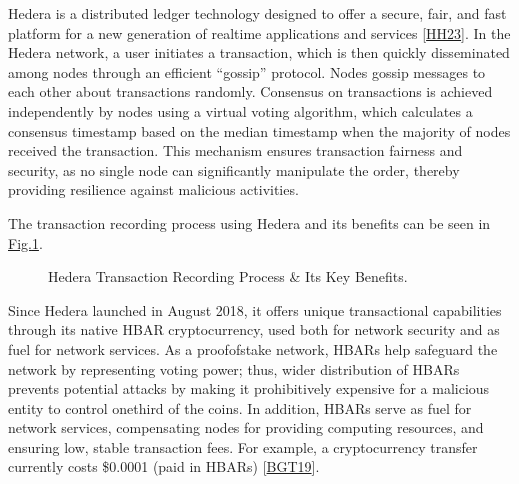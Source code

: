 \documentclass[letterpaper,10pt,english]{jupyterBook}
\let\sphinxpxdimen\pdfpxdimen\else\newdimen\sphinxpxdimen
\begin{document}
\sphinxAtStartPar
Hedera is a distributed ledger technology designed to offer a secure, fair, and fast platform for a new generation of real\sphinxhyphen{}time applications and services {[}\hyperlink{cite.HED/hed:id122}{HH23}{]}. In the Hedera network, a user initiates a transaction, which is then quickly disseminated among nodes through an efficient “gossip” protocol. Nodes gossip messages to each other about transactions randomly. Consensus on transactions is achieved independently by nodes using a virtual voting algorithm, which calculates a consensus timestamp based on the median timestamp when the majority of nodes received the transaction. This mechanism ensures transaction fairness and security, as no single node can significantly manipulate the order, thereby providing resilience against malicious activities.

\sphinxAtStartPar
The transaction recording process using Hedera and its benefits can be seen in \hyperref[\detokenize{HED/hed:hed-diagram}]{Fig.\@ \ref{\detokenize{HED/hed:hed-diagram}}}.

\begin{figure}[htbp]
\centering
\capstart

\noindent\sphinxincludegraphics[width=733\sphinxpxdimen,height=400\sphinxpxdimen]{{hashgraph}.png}
\caption{Hedera Transaction Recording Process \& Its Key Benefits.}\label{\detokenize{HED/hed:hed-diagram}}\end{figure}

\sphinxAtStartPar
Since Hedera launched in August 2018, it offers unique transactional capabilities through its native HBAR cryptocurrency, used both for network security and as fuel for network services. As a proof\sphinxhyphen{}of\sphinxhyphen{}stake network, HBARs help safeguard the network by representing voting power; thus, wider distribution of HBARs prevents potential attacks by making it prohibitively expensive for a malicious entity to control one\sphinxhyphen{}third of the coins. In addition, HBARs serve as fuel for network services, compensating nodes for providing computing resources, and ensuring low, stable transaction fees. For example, a cryptocurrency transfer currently costs \$0.0001 (paid in HBARs) {[}\hyperlink{cite.HED/hed:id123}{BGT19}{]}.
\end{document}
